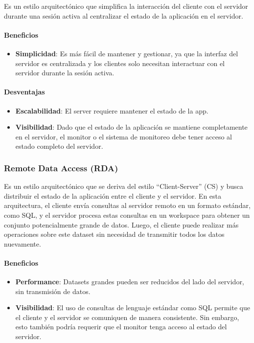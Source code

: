 \documentclass{article}
\begin{document}
		Es un estilo arquitectónico que simplifica la interacción del cliente con el servidor durante una sesión activa al centralizar el estado de la aplicación en el servidor.
		
				
		\paragraph{Beneficios}
		\begin{itemize}	
			\item {\textbf{Simplicidad}}: Es más fácil de mantener y gestionar, ya que la interfaz del servidor es centralizada y los clientes solo necesitan interactuar con el servidor durante la sesión activa.
			
		\end{itemize}
		
		\paragraph{Desventajas}
		\begin{itemize}	
			\item {\textbf{Escalabilidad}}: El server requiere mantener el estado de la app.
			
			\item {\textbf{Visibilidad}}: Dado que el estado de la aplicación se mantiene completamente en el servidor, el monitor o el sistema de monitoreo debe tener acceso al estado completo del servidor.
			
		\end{itemize}
		
		
		\subsubsection{Remote Data Access (RDA)}
		Es un estilo arquitectónico que se deriva del estilo ``Client-Server'' (CS) y busca distribuir el estado de la aplicación entre el cliente y el servidor. En esta arquitectura, el cliente envía consultas al servidor remoto en un formato estándar, como SQL, y el servidor procesa estas consultas en un workspace para obtener un conjunto potencialmente grande de datos. Luego, el cliente puede realizar más operaciones sobre este dataset sin necesidad de transmitir todos los datos nuevamente.
		\paragraph{Beneficios}
		\begin{itemize}	
			\item {\textbf{Performance}}: Datasets grandes pueden ser reducidos del lado del
			servidor, sin transmisión de datos.
			
			\item {\textbf{Visibilidad}}: El uso de consultas de lenguaje estándar como SQL permite que el cliente y el servidor se comuniquen de manera consistente. Sin embargo, esto también podría requerir que el monitor tenga acceso al estado del servidor.
			
		\end{itemize}
		
\end{document}
